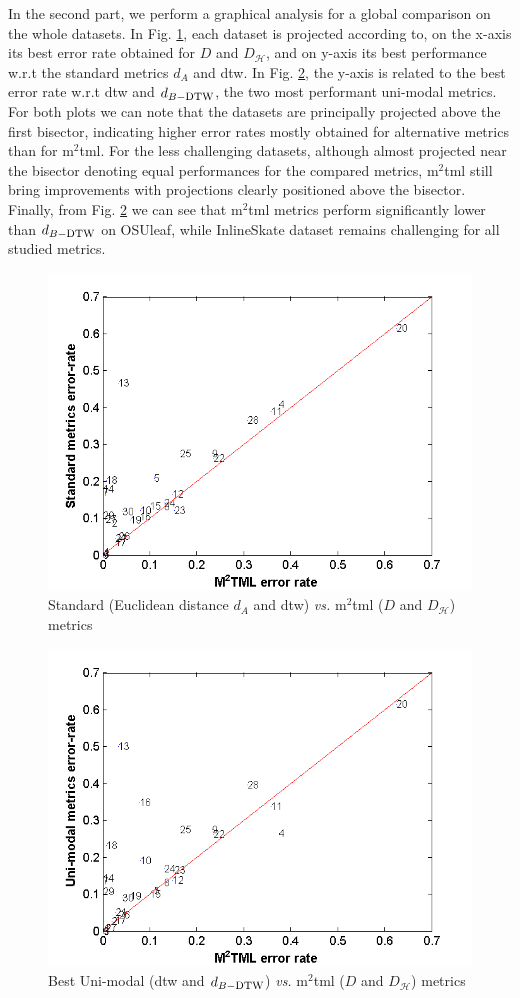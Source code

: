 In the second part,  we perform a graphical analysis for a global comparison on the whole datasets.  In Fig. \ref{fig:error1},  each dataset is projected according to, on the x-axis its best error rate obtained for $D$ and  $D_{\mathcal{H}}$, and on y-axis  its best performance w.r.t  the standard metrics $d_A$  and  {\sc dtw}. In Fig. \ref{fig:error2},  the y-axis is related to the best error rate w.r.t {\sc dtw} and $d_{B-\mbox{\sc dtw}}$, the two most performant uni-modal metrics. For both plots we can note that the datasets are principally  projected above the first bisector, indicating higher error rates mostly obtained for alternative metrics than for {\sc m}$^2${\sc tml}. For the less challenging datasets, although almost projected near the bisector denoting equal performances for the compared metrics, {\sc m}$^2${\sc tml}  still  bring improvements with projections clearly positioned  above the bisector.  Finally, from Fig. \ref{fig:error2} we can see that {\sc m}$^2${\sc tml} metrics perform significantly lower than $d_{B-\mbox{\sc dtw}}$ on OSUleaf, while InlineSkate dataset remains challenging for all studied metrics.
\begin{figure}[h!]
	\centering
	\includegraphics[width=0.6\linewidth]{images/Stand_m2tml}
	\caption{Standard (Euclidean distance $d_A$  and {\sc dtw}) {\it vs.} {\sc m}$^2${\sc tml} ($D$ and $D_{\mathcal{H}}$) metrics }
	\label{fig:error1}
\end{figure}
\begin{figure}[h!]
	\centering
	\includegraphics[width=0.6\linewidth]{images/Unimod_m2tml}
	\caption{Best Uni-modal ({\sc dtw} and $d_{B-\mbox{\sc dtw}}$) {\it vs.} {\sc m}$^2${\sc tml} ($D$  and $D_{\mathcal{H}}$) metrics }
	\label{fig:error2}
\end{figure}


